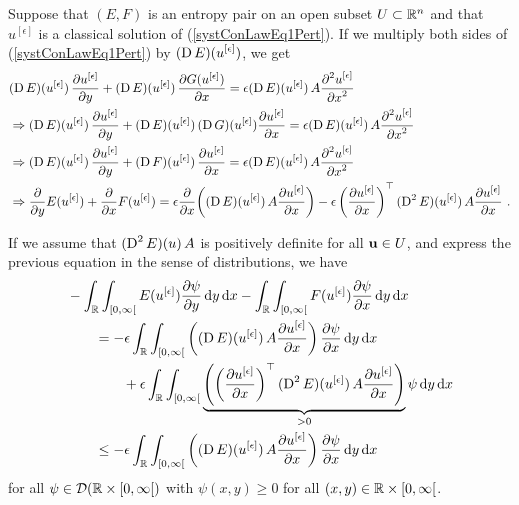 Suppose that $(E,F)$ is an entropy pair on an open subset $U \subset \RR^n$
and that $\displaystyle u^{[\epsilon]}$ is a classical solution of
(\ref{systConLawEq1Pert}).  If we multiply both sides of
(\ref{systConLawEq1Pert}) by
$\displaystyle (\diff E)(u^{[\epsilon]})$, we get
\begin{align*}
&(\diff E)(u^{[\epsilon]})\, \pdydx{u^{[\epsilon]}}{y}
+ (\diff E)(u^{[\epsilon]})\, \pdydx{G(u^{[\epsilon]})}{x}
= \epsilon (\diff E)(u^{[\epsilon]}) \, A \pdydxn{u^{[\epsilon]}}{x}{2} \\
&\Rightarrow
(\diff E)(u^{[\epsilon]})\, \pdydx{u^{[\epsilon]}}{y}
+ (\diff E)(u^{[\epsilon]})\, (\diff G)(u^{[\epsilon]})
\pdydx{u^{[\epsilon]}}{x} = \epsilon (\diff E)(u^{[\epsilon]}) \, A
\pdydxn{u^{[\epsilon]}}{x}{2} \\
&\Rightarrow
(\diff E)(u^{[\epsilon]})\, \pdydx{u^{[\epsilon]}}{y}
+ (\diff F)(u^{[\epsilon]})\, \pdydx{u^{[\epsilon]}}{x}
= \epsilon (\diff E)(u^{[\epsilon]}) \, A
\pdydxn{u^{[\epsilon]}}{x}{2} \\
&\Rightarrow
\pdfdx{E(u^{[\epsilon]})}{y} + \pdfdx{F(u^{[\epsilon]})}{x}
= \epsilon \pdfdx{ \left( (\diff E)(u^{[\epsilon]}) \,
A \pdydx{u^{[\epsilon]}}{x} \right) }{x}
- \epsilon \left(\pdydx{u^{[\epsilon]}}{x}\right)^\top
(\diff^2 E)(u^{[\epsilon]}) \, A \pdydx{u^{[\epsilon]}}{x} \ .
\end{align*}

If we assume that $\displaystyle (\diff^2 E)(u) \, A$ is
positively definite for all $\VEC{u} \in U$, and
express the previous equation in the sense of distributions,
we have
\begin{equation} \label{viscSolEq1}
\begin{split}
&-\int_{\RR} \int_{[0,\infty[} E(u^{[\epsilon]}) \pdydx{\psi}{y} \dx{y}\dx{x}
- \int_{\RR} \int_{[0,\infty[} F(u^{[\epsilon]}) \pdydx{\psi}{x} \dx{y}\dx{x}
\\
&\qquad = - \epsilon \int_{\RR} \int_{[0,\infty[}
\left( (\diff E)(u^{[\epsilon]}) \,
A \pdydx{u^{[\epsilon]}}{x} \right) \pdydx{\psi}{x} \dx{y}\dx{x} \\
&\qquad\qquad + \epsilon \int_{\RR}\int_{[0,\infty[}
\underbrace{\left( \left(\pdydx{u^{[\epsilon]}}{x}\right)^\top
(\diff^2 E)(u^{[\epsilon]}) \, A \pdydx{u^{[\epsilon]}}{x}\right)}_{>0}
\psi \dx{y}\dx{x} \\
&\qquad \leq - \epsilon \int_{\RR} \int_{[0,\infty[}
\left( (\diff E)(u^{[\epsilon]}) \,
A \pdydx{u^{[\epsilon]}}{x} \right) \pdydx{\psi}{x} \dx{y}\dx{x}
\end{split}
\end{equation}
for all $\psi \in \DD(\RR\times [0,\infty[)$ with $\psi(x,y) \geq 0$
for all $(x,y) \in \RR\times [0,\infty[$.

